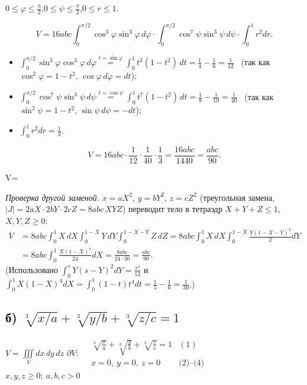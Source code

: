 $0\leqslant\varphi\leqslant\frac\pi2$,\quad $0\leqslant\psi\leqslant\frac\pi2$,\quad $0\leqslant r\leqslant1$.

\[
V=16abc\int_0^{\pi/2}\cos^3\varphi\sin^3\varphi\,d\varphi\cdot\int_0^{\pi/2}\cos^7\psi\sin^3\psi\,d\psi\cdot\int_0^1r^2dr .
\]
\begin{itemize}
\item $\displaystyle\int_0^{\pi/2}\sin^3\varphi\cos^3\varphi\,d\varphi\overset{t=\sin\varphi}{=}\int_0^1t^3(1-t^2)\,dt=\frac14-\frac16=\frac1{12}$ \ (так как $\cos^2\varphi=1-t^2$, $\cos\varphi\,d\varphi=dt$);
\item $\displaystyle\int_0^{\pi/2}\cos^7\psi\sin^3\psi\,d\psi\overset{t=\cos\psi}{=}\int_0^1t^7(1-t^2)\,dt=\frac18-\frac1{10}=\frac1{40}$ \ (так как $\sin^2\psi=1-t^2$, $\sin\psi\,d\psi=-dt$);
\item $\displaystyle\int_0^1r^2dr=\frac13$.
\end{itemize}
\[
V=16abc\cdot\frac1{12}\cdot\frac1{40}\cdot\frac13=\frac{16abc}{1440}=\frac{abc}{90}.
\]

\begin{answerbox}
V=
\end{answerbox}

\emph{Проверка другой заменой.} $x=aX^2$, $y=bY^2$, $z=cZ^2$ (треугольная замена, $|J|=2aX\cdot2bY\cdot2cZ=8abc\,XYZ$) переводит тело в тетраэдр $X+Y+Z\leqslant1$, $X,Y,Z\geqslant0$:
\[
\begin{aligned}V&=8abc\int_0^1X\,dX\int_0^{1-X}Y\,dY\int_0^{1-X-Y}Z\,dZ=8abc\int_0^1X\,dX\int_0^{1-X}\frac{Y(1-X-Y)^2}{2}dY\\
&=8abc\int_0^1\frac{X(1-X)^4}{24}dX=\frac{8abc}{24\cdot30}=\frac{abc}{90}.\end{aligned}
\]
(Использовано $\int_0^sY(s-Y)^2dY=\frac{s^4}{12}$ и $\int_0^1X(1-X)^4dX=\int_0^1(1-t)t^4dt=\frac15-\frac16=\frac1{30}$.) \checkmark

\clearpage
\subsection*{б) $\sqrt[3]{x/a}+\sqrt[3]{y/b}+\sqrt[3]{z/c}=1$}

\begin{shapka}
$\displaystyle V=\iiint\limits_{V}dx\,dy\,dz$
\tcblower
$\partial V:\quad
\begin{array}{ll}
\sqrt[3]{\frac xa}+\sqrt[3]{\frac yb}+\sqrt[3]{\frac zc}=1 & (1)\\
x=0,\ y=0,\ z=0 & \text{(2)--(4)}
\end{array}$\\[1mm]
$x,y,z\geqslant0;\ a,b,c>0$
\end{shapka}

